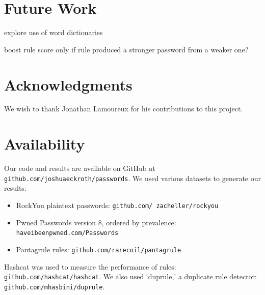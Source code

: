 \documentclass[letterpaper,twocolumn,10pt]{article}
\begin{document}
\section{Future Work}

explore use of word dictionaries

boost rule score only if rule produced a stronger password from a weaker one?

\section*{Acknowledgments}

We wish to thank Jonathan Lamoureux for his contributions to this project.

\section*{Availability}

Our code and results are available on GitHub at
\texttt{github.com/joshuaeckroth/passwords}. We used various datasets
to generate our results:

\begin{itemize}
\item RockYou plaintext passwords:
\texttt{github.com/ zacheller/rockyou}
\item Pwned Passwords version 8, ordered by prevalence:
\texttt{haveibeenpwned.com/Passwords}
\item Pantagrule rules: \texttt{github.com/rarecoil/pantagrule}
\end{itemize}

Hashcat was used to measure the performance of rules:
\texttt{github.com/hashcat/hashcat}.
We also used
`duprule,' a duplicate rule detector:
\texttt{github.com/mhasbini/duprule}.





\end{document}
